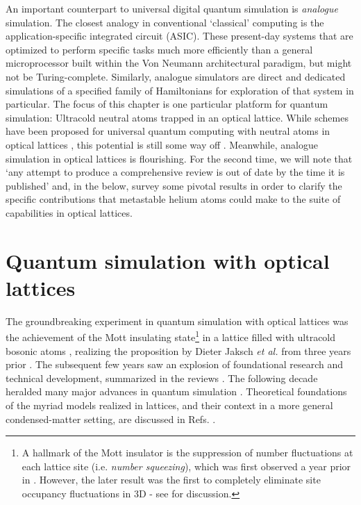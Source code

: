 	An important counterpart to universal digital quantum simulation is \emph{analogue} simulation.
	The closest analogy in conventional `classical' computing is the application-specific integrated circuit (ASIC).
	These present-day systems that are optimized to perform specific tasks much more efficiently than a general microprocessor built within the Von Neumann architectural paradigm, but might not be Turing-complete.
	Similarly, analogue simulators are direct and dedicated simulations of a specified family of Hamiltonians for exploration of that system in particular.
	The focus of this chapter is one particular platform for quantum simulation: Ultracold neutral atoms trapped in an optical lattice. 
	While schemes have been proposed for universal quantum computing with neutral atoms in optical lattices \cite{Brennen99,Henriet20}, this potential is still some way off \cite{Markov00}.
	Meanwhile, analogue simulation in optical lattices is flourishing.
	For the second time, we will note that `any attempt to produce a comprehensive review is out of date by the time it is published' and, in the below, survey some pivotal results in order to clarify the specific contributions that metastable helium atoms could make to the suite of capabilities in optical lattices.



\section{Quantum simulation with optical lattices}


	The groundbreaking experiment in quantum simulation with optical lattices was the achievement of the Mott insulating state\footnote{A hallmark of the Mott insulator is the suppression of number fluctuations at each lattice site (i.e.
	\emph{number squeezing}), which was first observed a year prior in \cite{Orzel01}.
	However, the later result was the first to completely eliminate site occupancy fluctuations in 3D - see \cite{Morsch06} for discussion.} in a lattice filled with ultracold bosonic atoms \cite{Greiner01}, realizing the proposition by Dieter Jaksch \emph{et al.} from three years prior \cite{Jaksch98}.
	The subsequent few years saw an explosion of foundational research and technical development, summarized in the reviews \cite{Morsch06,Bloch08}. 
	The following decade heralded many major advances in quantum simulation \cite{Bloch12,Gross17}.
	Theoretical foundations of the myriad models realized in lattices, and their context in a more general condensed-matter setting, are discussed in Refs. \cite{LewensteinLattices, Lewenstein07}.

